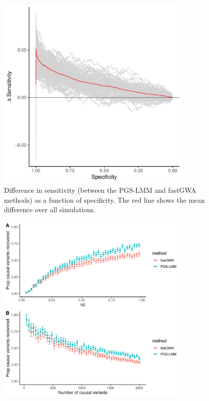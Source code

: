 \documentclass[doublespacing]{bmcart}
\begin{document}
\begin{backmatter}
\begin{figure}[h!]
	\includegraphics[width=0.85\textwidth]{images/Fig2.png}
  \caption{
      Difference in sensitivity (between the PGS-LMM and fastGWA methods) as a function of specificity. The red line shows the mean difference over all simulations.}
      \end{figure}

\begin{figure}[h!]
  \includegraphics[width=0.85\textwidth]{images/Fig3.png}


\end{figure}
\end{backmatter}
\end{document}
